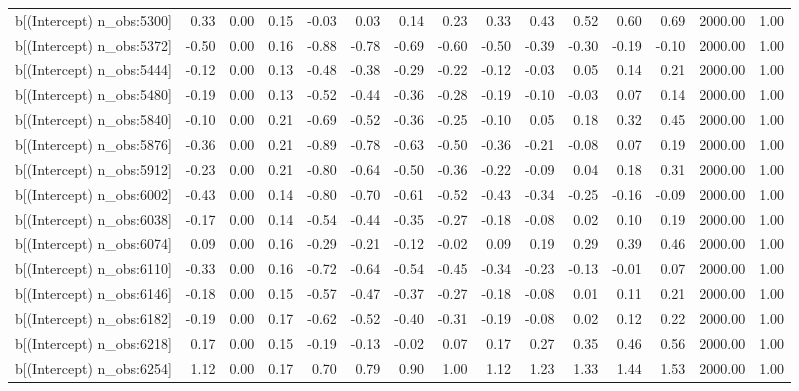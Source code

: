 \begin{table}[ht]
\begin{tabular}{rrrrrrrrrrrrrrr}
  b[(Intercept) n\_obs:5300] & 0.33 & 0.00 & 0.15 & -0.03 & 0.03 & 0.14 & 0.23 & 0.33 & 0.43 & 0.52 & 0.60 & 0.69 & 2000.00 & 1.00 \\ 
  b[(Intercept) n\_obs:5372] & -0.50 & 0.00 & 0.16 & -0.88 & -0.78 & -0.69 & -0.60 & -0.50 & -0.39 & -0.30 & -0.19 & -0.10 & 2000.00 & 1.00 \\ 
  b[(Intercept) n\_obs:5444] & -0.12 & 0.00 & 0.13 & -0.48 & -0.38 & -0.29 & -0.22 & -0.12 & -0.03 & 0.05 & 0.14 & 0.21 & 2000.00 & 1.00 \\ 
  b[(Intercept) n\_obs:5480] & -0.19 & 0.00 & 0.13 & -0.52 & -0.44 & -0.36 & -0.28 & -0.19 & -0.10 & -0.03 & 0.07 & 0.14 & 2000.00 & 1.00 \\ 
  b[(Intercept) n\_obs:5840] & -0.10 & 0.00 & 0.21 & -0.69 & -0.52 & -0.36 & -0.25 & -0.10 & 0.05 & 0.18 & 0.32 & 0.45 & 2000.00 & 1.00 \\ 
  b[(Intercept) n\_obs:5876] & -0.36 & 0.00 & 0.21 & -0.89 & -0.78 & -0.63 & -0.50 & -0.36 & -0.21 & -0.08 & 0.07 & 0.19 & 2000.00 & 1.00 \\ 
  b[(Intercept) n\_obs:5912] & -0.23 & 0.00 & 0.21 & -0.80 & -0.64 & -0.50 & -0.36 & -0.22 & -0.09 & 0.04 & 0.18 & 0.31 & 2000.00 & 1.00 \\ 
  b[(Intercept) n\_obs:6002] & -0.43 & 0.00 & 0.14 & -0.80 & -0.70 & -0.61 & -0.52 & -0.43 & -0.34 & -0.25 & -0.16 & -0.09 & 2000.00 & 1.00 \\ 
  b[(Intercept) n\_obs:6038] & -0.17 & 0.00 & 0.14 & -0.54 & -0.44 & -0.35 & -0.27 & -0.18 & -0.08 & 0.02 & 0.10 & 0.19 & 2000.00 & 1.00 \\ 
  b[(Intercept) n\_obs:6074] & 0.09 & 0.00 & 0.16 & -0.29 & -0.21 & -0.12 & -0.02 & 0.09 & 0.19 & 0.29 & 0.39 & 0.46 & 2000.00 & 1.00 \\ 
  b[(Intercept) n\_obs:6110] & -0.33 & 0.00 & 0.16 & -0.72 & -0.64 & -0.54 & -0.45 & -0.34 & -0.23 & -0.13 & -0.01 & 0.07 & 2000.00 & 1.00 \\ 
  b[(Intercept) n\_obs:6146] & -0.18 & 0.00 & 0.15 & -0.57 & -0.47 & -0.37 & -0.27 & -0.18 & -0.08 & 0.01 & 0.11 & 0.21 & 2000.00 & 1.00 \\ 
  b[(Intercept) n\_obs:6182] & -0.19 & 0.00 & 0.17 & -0.62 & -0.52 & -0.40 & -0.31 & -0.19 & -0.08 & 0.02 & 0.12 & 0.22 & 2000.00 & 1.00 \\ 
  b[(Intercept) n\_obs:6218] & 0.17 & 0.00 & 0.15 & -0.19 & -0.13 & -0.02 & 0.07 & 0.17 & 0.27 & 0.35 & 0.46 & 0.56 & 2000.00 & 1.00 \\ 
  b[(Intercept) n\_obs:6254] & 1.12 & 0.00 & 0.17 & 0.70 & 0.79 & 0.90 & 1.00 & 1.12 & 1.23 & 1.33 & 1.44 & 1.53 & 2000.00 & 1.00 \\ 

\end{tabular}
\end{table}
